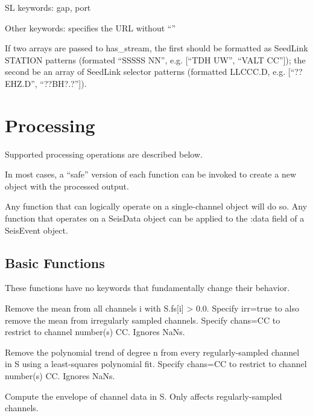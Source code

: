 \documentclass[letterpaper,11pt,english]{sphinxmanual}
\begin{document}
\begin{DUlineblock}{0em}
\item[] SL keywords: gap, port
\item[] Other keywords:  specifies the URL without “”
\end{DUlineblock}

If two arrays are passed to has\_stream, the first should be
formatted as SeedLink STATION patterns (formated “SSSSS NN”, e.g.
{[}“TDH UW”, “VALT CC”{]}); the second be an array of SeedLink selector
patterns (formatted LLCCC.D, e.g. {[}“??EHZ.D”, “??BH?.?”{]}).


\chapter{Processing}
\label{\detokenize{index:processing}}
Supported processing operations are described below.

In most cases, a “safe” version of each function can be invoked to create a
new object with the processed output.

Any function that can logically operate on a single-channel object will do so. Any
function that operates on a SeisData object can be applied to the :data field of a
SeisEvent object.


\section{Basic Functions}
\label{\detokenize{src/Processing/processing:basic-functions}}\label{\detokenize{src/Processing/processing::doc}}
These functions have no keywords that fundamentally change their behavior.

Remove the mean from all channels i with S.fs{[}i{]} \textgreater{} 0.0. Specify irr=true to also
remove the mean from irregularly sampled channels. Specify chans=CC to restrict
to channel number(s) CC. Ignores NaNs.

Remove the polynomial trend of degree n from every regularly-sampled channel
in S using a least-squares polynomial fit. Specify chans=CC to restrict
to channel number(s) CC. Ignores NaNs.

Compute the envelope of channel data in S. Only affects regularly-sampled
channels.


\begin{fulllineitems}
\end{fulllineitems}
\end{document}
